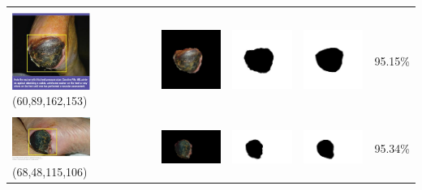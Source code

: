 \begin{table}[H]
\begin{tabular}{|m{1.0in}|m{1.0in}|m{1.0in}|m{1.0in}|m{0.6in}|}
		&  &  & \\
		\includegraphics[width=1.0in]{gambar/hasil_segmentasi/luka_hitam/image_4_rect.jpg} {\centering\fontsize{10}{10}\selectfont(60,89,162,153)}&
		\includegraphics[width=1.0in]{gambar/hasil_segmentasi/luka_hitam/result_4.jpg}&
		\includegraphics[width=1.0in]{gambar/hasil_segmentasi/luka_hitam/mask_r_4.jpg}&
		\includegraphics[width=1.0in]{gambar/hasil_segmentasi/luka_hitam/4_r.jpg}&
		95.15\% \\
		\hline
		
		&  &  & \\
		\includegraphics[width=1.0in]{gambar/hasil_segmentasi/luka_hitam/image_5_rect.jpg} {\centering\fontsize{10}{10}\selectfont(68,48,115,106)}&
		\includegraphics[width=1.0in]{gambar/hasil_segmentasi/luka_hitam/result_5.jpg}&
		\includegraphics[width=1.0in]{gambar/hasil_segmentasi/luka_hitam/mask_r_5.jpg}&
		\includegraphics[width=1.0in]{gambar/hasil_segmentasi/luka_hitam/5_r.jpg}&
		95.34\% \\
		\hline
		

\end{tabular}
\end{table}
